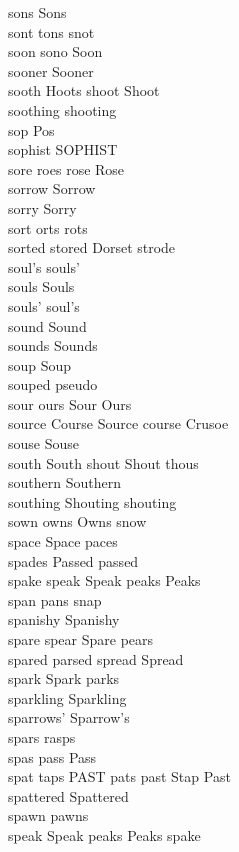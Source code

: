 sons Sons\\
sont tons snot\\
soon sono Soon\\
sooner Sooner\\
sooth Hoots shoot Shoot\\
soothing shooting\\
sop Pos\\
sophist SOPHIST\\
sore roes rose Rose\\
sorrow Sorrow\\
sorry Sorry\\
sort orts rots\\
sorted stored Dorset strode\\
soul's souls'\\
souls Souls\\
souls' soul's\\
sound Sound\\
sounds Sounds\\
soup Soup\\
souped pseudo\\
sour ours Sour Ours\\
source Course Source course Crusoe\\
souse Souse\\
south South shout Shout thous\\
southern Southern\\
southing Shouting shouting\\
sown owns Owns snow\\
space Space paces\\
spades Passed passed\\
spake speak Speak peaks Peaks\\
span pans snap\\
spanishy Spanishy\\
spare spear Spare pears\\
spared parsed spread Spread\\
spark Spark parks\\
sparkling Sparkling\\
sparrows' Sparrow's\\
spars rasps\\
spas pass Pass\\
spat taps PAST pats past Stap Past\\
spattered Spattered\\
spawn pawns\\
speak Speak peaks Peaks spake\\
